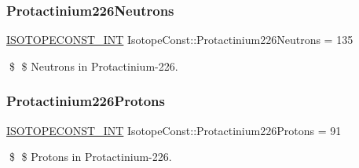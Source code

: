 \subsubsection{\texorpdfstring{Protactinium226\+Neutrons}{Protactinium226Neutrons}}
{\footnotesize\ttfamily \mbox{\hyperlink{group___isotope_const-_macros_ga5f18360b3e99483a35c32d789e62621c}{I\+S\+O\+T\+O\+P\+E\+C\+O\+N\+S\+T\+\_\+\+I\+NT}} Isotope\+Const\+::\+Protactinium226\+Neutrons = 135}

\$ \$ Neutrons in Protactinium-\/226. \mbox{\label{group___isotope_const-_protactinium-_pa226_gadaef9b7a63d167820a7dc4aa4e70bbe0}} 
\subsubsection{\texorpdfstring{Protactinium226\+Protons}{Protactinium226Protons}}
{\footnotesize\ttfamily \mbox{\hyperlink{group___isotope_const-_macros_ga5f18360b3e99483a35c32d789e62621c}{I\+S\+O\+T\+O\+P\+E\+C\+O\+N\+S\+T\+\_\+\+I\+NT}} Isotope\+Const\+::\+Protactinium226\+Protons = 91}

\$ \$ Protons in Protactinium-\/226. 
